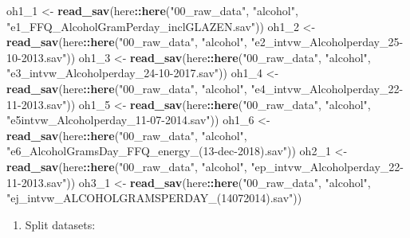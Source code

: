 \documentclass[]{book}
\newenvironment{Shaded}{\begin{snugshade}}{\end{snugshade}}
\newcommand{\DecValTok}[1]{\textcolor[rgb]{0.00,0.00,0.81}{#1}}
\newcommand{\KeywordTok}[1]{\textcolor[rgb]{0.13,0.29,0.53}{\textbf{#1}}}
\newcommand{\NormalTok}[1]{#1}
\newcommand{\OperatorTok}[1]{\textcolor[rgb]{0.81,0.36,0.00}{\textbf{#1}}}
\newcommand{\StringTok}[1]{\textcolor[rgb]{0.31,0.60,0.02}{#1}}
\providecommand{\tightlist}{%
  \setlength{\itemsep}{0pt}\setlength{\parskip}{0pt}}
\begin{document}
\begin{Shaded}
\begin{Highlighting}[]
\NormalTok{oh1_}\DecValTok{1}\NormalTok{ <-}\StringTok{ }\KeywordTok{read_sav}\NormalTok{(here}\OperatorTok{::}\KeywordTok{here}\NormalTok{(}\StringTok{"00_raw_data"}\NormalTok{, }\StringTok{"alcohol"}\NormalTok{, }\StringTok{"e1_FFQ_AlcoholGramPerday_inclGLAZEN.sav"}\NormalTok{))}
\NormalTok{oh1_}\DecValTok{2}\NormalTok{ <-}\StringTok{ }\KeywordTok{read_sav}\NormalTok{(here}\OperatorTok{::}\KeywordTok{here}\NormalTok{(}\StringTok{"00_raw_data"}\NormalTok{, }\StringTok{"alcohol"}\NormalTok{, }\StringTok{"e2_intvw_Alcoholperday_25-10-2013.sav"}\NormalTok{))}
\NormalTok{oh1_}\DecValTok{3}\NormalTok{ <-}\StringTok{ }\KeywordTok{read_sav}\NormalTok{(here}\OperatorTok{::}\KeywordTok{here}\NormalTok{(}\StringTok{"00_raw_data"}\NormalTok{, }\StringTok{"alcohol"}\NormalTok{, }\StringTok{"e3_intvw_Alcoholperday_24-10-2017.sav"}\NormalTok{))}
\NormalTok{oh1_}\DecValTok{4}\NormalTok{ <-}\StringTok{ }\KeywordTok{read_sav}\NormalTok{(here}\OperatorTok{::}\KeywordTok{here}\NormalTok{(}\StringTok{"00_raw_data"}\NormalTok{, }\StringTok{"alcohol"}\NormalTok{, }\StringTok{"e4_intvw_Alcoholperday_22-11-2013.sav"}\NormalTok{))}
\NormalTok{oh1_}\DecValTok{5}\NormalTok{ <-}\StringTok{ }\KeywordTok{read_sav}\NormalTok{(here}\OperatorTok{::}\KeywordTok{here}\NormalTok{(}\StringTok{"00_raw_data"}\NormalTok{, }\StringTok{"alcohol"}\NormalTok{, }\StringTok{"e5intvw_Alcoholperday_11-07-2014.sav"}\NormalTok{))}
\NormalTok{oh1_}\DecValTok{6}\NormalTok{ <-}\StringTok{ }\KeywordTok{read_sav}\NormalTok{(here}\OperatorTok{::}\KeywordTok{here}\NormalTok{(}\StringTok{"00_raw_data"}\NormalTok{, }\StringTok{"alcohol"}\NormalTok{, }\StringTok{"e6_AlcoholGramsDay_FFQ_energy_(13-dec-2018).sav"}\NormalTok{))}
\NormalTok{oh2_}\DecValTok{1}\NormalTok{ <-}\StringTok{ }\KeywordTok{read_sav}\NormalTok{(here}\OperatorTok{::}\KeywordTok{here}\NormalTok{(}\StringTok{"00_raw_data"}\NormalTok{, }\StringTok{"alcohol"}\NormalTok{, }\StringTok{"ep_intvw_Alcoholperday_22-11-2013.sav"}\NormalTok{))}
\NormalTok{oh3_}\DecValTok{1}\NormalTok{ <-}\StringTok{ }\KeywordTok{read_sav}\NormalTok{(here}\OperatorTok{::}\KeywordTok{here}\NormalTok{(}\StringTok{"00_raw_data"}\NormalTok{, }\StringTok{"alcohol"}\NormalTok{, }\StringTok{"ej_intvw_ALCOHOLGRAMSPERDAY_(14072014).sav"}\NormalTok{))}
\end{Highlighting}
\end{Shaded}

\begin{enumerate}
\def\labelenumi{\arabic{enumi}.}
\setcounter{enumi}{1}
\tightlist
\item
  Split datasets:
\end{enumerate}
\end{document}
